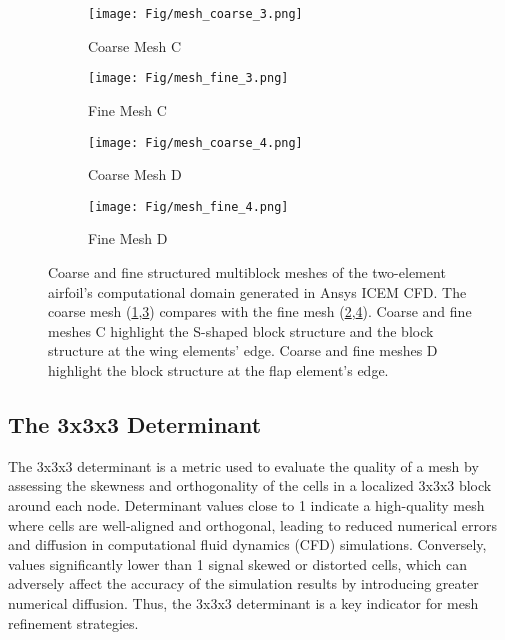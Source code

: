 \begin{figure}[H]
  \centering
  \begin{subfigure}[b]{0.49\textwidth}
    \texttt{[image: Fig/mesh\_coarse\_3.png]}
    \caption{Coarse Mesh C}
    \label{fig:coarse3}
  \end{subfigure}
  \hfill
  \begin{subfigure}[b]{0.49\textwidth}
    \texttt{[image: Fig/mesh\_fine\_3.png]}
    \caption{Fine Mesh C}
    \label{fig:fine3}
  \end{subfigure}

  \begin{subfigure}[b]{0.49\textwidth}
    \texttt{[image: Fig/mesh\_coarse\_4.png]}
    \caption{Coarse Mesh D}
    \label{fig:coarse4}
  \end{subfigure}
  \hfill
  \begin{subfigure}[b]{0.49\textwidth}
    \texttt{[image: Fig/mesh\_fine\_4.png]}
    \caption{Fine Mesh D}
    \label{fig:fine4}
  \end{subfigure}

   \caption{Coarse and fine structured multiblock meshes of the two-element airfoil's computational domain generated in Ansys ICEM CFD. The coarse mesh (\ref{fig:coarse3},\ref{fig:coarse4}) compares with the fine mesh (\ref{fig:fine3},\ref{fig:fine4}). Coarse and fine meshes C highlight the S-shaped block structure and the block structure at the wing elements' edge. Coarse and fine meshes D highlight the block structure at the flap element's edge.}
  \label{fig:meshComparisonPart2}
\end{figure}


\subsection{The 3x3x3 Determinant}



The 3x3x3 determinant is a metric used to evaluate the quality of a mesh by assessing the skewness and orthogonality of the cells in a localized 3x3x3 block around each node. Determinant values close to 1 indicate a high-quality mesh where cells are well-aligned and orthogonal, leading to reduced numerical errors and diffusion in computational fluid dynamics (CFD) simulations. Conversely, values significantly lower than 1 signal skewed or distorted cells, which can adversely affect the accuracy of the simulation results by introducing greater numerical diffusion. Thus, the 3x3x3 determinant is a key indicator for mesh refinement strategies. \\

